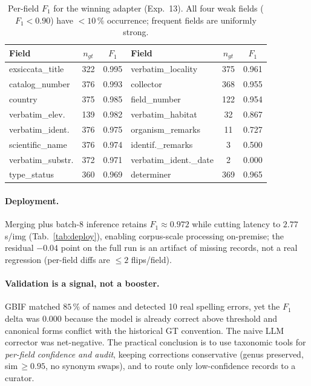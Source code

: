 \begin{table}[t]
\centering
\small
\setlength{\tabcolsep}{3pt}
\begin{tabular}{@{}lcc@{\hskip 10pt}lcc@{}}
\toprule
Field & $n_{gt}$ & $F_1$ & Field & $n_{gt}$ & $F_1$ \\
\midrule
exsiccata\_title  & 322 & 0.995 & verbatim\_locality      & 375 & 0.961 \\
catalog\_number   & 376 & 0.993 & collector               & 368 & 0.955 \\
country           & 375 & 0.985 & field\_number           & 122 & 0.954 \\
verbatim\_elev.   & 139 & 0.982 & verbatim\_habitat       & 32  & 0.867 \\
verbatim\_ident.  & 376 & 0.975 & organism\_remarks       & 11  & 0.727 \\
scientific\_name  & 376 & 0.974 & identif.\_remarks       & 3   & 0.500 \\
verbatim\_substr. & 372 & 0.971 & verbatim\_ident.\_date  & 2   & 0.000 \\
type\_status      & 360 & 0.969 & determiner              & 369 & 0.965 \\
\bottomrule
\end{tabular}
\caption{Per-field $F_1$ for the winning adapter (Exp.~13). All four weak
fields ($F_1<0.90$) have $<\!10\,\%$ occurrence; frequent fields are
uniformly strong.}
\label{tab:perfield}
\end{table}

\paragraph{Deployment.}
Merging plus batch-8 inference retains $F_1\!\approx\!0.972$ while cutting
latency to $2.77$\,s/img (Tab.~\ref{tab:deploy}), enabling corpus-scale
processing on-premise; the residual $-0.04$ point on the full run is an artifact
of missing records, not a real regression (per-field diffs are $\le\!2$
flips/field).

\paragraph{Validation is a signal, not a booster.}
GBIF matched $85\,\%$ of names and detected 10 real spelling errors, yet the
$F_1$ delta was $0.000$ because the model is already correct above threshold and
canonical forms conflict with the historical GT convention. The naive LLM
corrector was net-negative. The practical conclusion is to use taxonomic tools
for \emph{per-field confidence and audit}, keeping corrections conservative
(genus preserved, sim\,$\ge0.95$, no synonym swaps), and to route only
low-confidence records to a curator.

